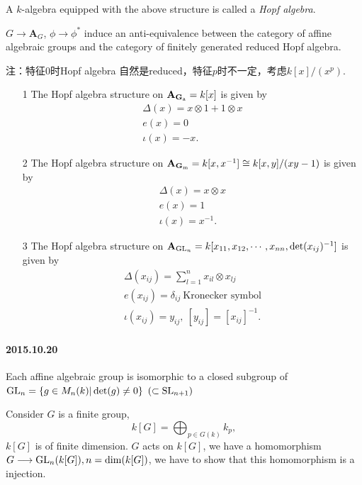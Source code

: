 \begin{definition}
	A $k$-algebra equipped with the above structure is called a {\em Hopf algebra}.
\end{definition}
\begin{corollary}
	$G\longrightarrow \mathbf{A}_G$, $\phi \longrightarrow \phi^*$ induce an anti-equivalence between the category of affine algebraic groups and the category of finitely generated reduced Hopf algebra.
\end{corollary}
注：特征$0$时Hopf algebra 自然是reduced，特征$p$时不一定，考虑$k[x]/(x^p) $.
\begin{example}
	\begin{itemize}
		\item[1] The Hopf algebra structure on $\mathbf{A}_{\mathbf{G}_\mathrm{a}}=k[x]$ is given by
		\begin{align*}
			\Delta(x)=x\otimes 1 +1\otimes x \\
			e(x)=0\\
			\iota(x)=-x.
		\end{align*}
		\item[2] The Hopf algebra structure on $\mathbf{A}_{\mathbf{G}_\mathrm{m}}=k[x,x^{-1}]\cong k[x,y]/(xy-1)$ is given by
		\begin{align*}
			\Delta(x)=x\otimes x \\
			e(x)=1\\
			\iota(x)=x^{-1}.
		\end{align*}
		\item[3] The Hopf algebra structure on $\mathbf{A}_{\operatorname {GL}_n}=k[x_{11},x_{12},\cdots,x_{nn},\det(x_{ij})^{-1}]$ is given by
		\begin{align*}
			\Delta(x_{ij})=\sum_{l=1}^n x_{il}\otimes x_{lj} \\
			e(x_{ij})=\delta_{ij} \ \mbox{Kronecker symbol}\\
			\iota(x_{ij})=y_{ij}, \ [y_{ij}]=[x_{ij}]^{-1}.
		\end{align*}
	\end{itemize}
\end{example}
\paragraph{2015.10.20}
\begin{theorem}\label{closedsubgp}
	Each affine algebraic group is isomorphic to a closed subgroup of $\operatorname {GL}_n = \{g\in M_n(k)|\det(g)\neq 0\}$ $(\subset \operatorname {SL}_{n+1})$
\end{theorem}
Consider $G$ is a finite group, 
$$k[G]=\bigoplus_{p\in G(k)}k_p,$$ 
$k[G]$ is of finite dimension. $G$ acts on $k[G]$, we have a homomorphism $G\longrightarrow \operatorname {GL}_n(k[G]), n=\dim (k[G])$, we have to show that this homomorphism is a injection.

